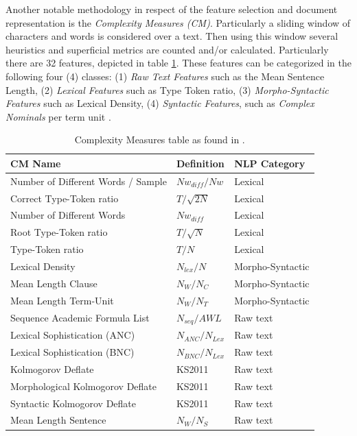 Another notable methodology in respect of the feature selection and document representation is the \textit{Complexity Measures (CM)}. Particularly a sliding window of characters and words is considered over a text. Then using this window several heuristics and superficial metrics are counted and/or calculated. Particularly there are 32 features, depicted in table \ref{chap:relevant_work:tbl:complexity_measures}. These features can be categorized in the following four (4) classes: (1) \textit{Raw Text Features} such as the Mean Sentence Length, (2) \textit{Lexical Features} such as Type Token ratio, (3) \textit{Morpho-Syntactic Features} such as Lexical Density, (4) \textit{Syntactic Features}, such as \textit{Complex Nominals} per term unit \parencite{strobel2018text}.

\begin{table}[t]
	\center
	\caption {Complexity Measures table as found in \parencite{strobel2018text}.}\label{chap:relevant_work:tbl:complexity_measures}
	\begin{tabular}{lll}
		\hline
		CM Name & Definition & NLP Category \\
		\hline
		Number of Different Words / Sample & $Nw_{diff} / Nw$ & Lexical \\
		Correct Type-Token ratio & $T/\sqrt{2N}$ & Lexical \\
		Number of Different Words & $Nw_{diff}$ & Lexical \\
		Root Type-Token ratio & $T/\sqrt{N}$ & Lexical \\
		Type-Token ratio & $T/N$ & Lexical \\
		Lexical Density & $N_{lex}/N$ & Morpho-Syntactic \\
		Mean Length Clause & $N_{W}/N_{C}$ & Morpho-Syntactic \\
		Mean Length Term-Unit & $N_{W}/N_{T}$ & Morpho-Syntactic \\
		Sequence Academic Formula List & $N_{seq}/AWL$ & Raw text \\
		Lexical Sophistication (ANC) & $N_{ANC}/N_{Lex}$ & Raw text \\
		Lexical Sophistication (BNC) & $N_{BNC}/N_{Lex}$ & Raw text \\
		Kolmogorov Deflate & KS2011 & Raw text \\
		Morphological Kolmogorov Deflate & KS2011 & Raw text \\
		Syntactic Kolmogorov Deflate & KS2011 & Raw text \\
		Mean Length Sentence & $N_{W}/N_{S}$ & Raw text \\

\end{tabular}
\end{table}
